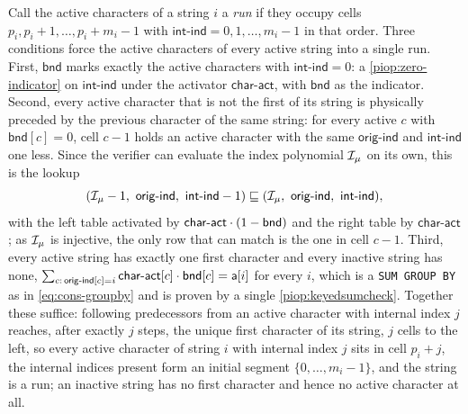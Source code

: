  Call the active characters of a string $i$ a \emph{run} if they occupy cells $p_i, p_i+1, \dots, p_i+m_i-1$ with $\mathsf{int\text{-}ind} = 0, 1, \dots, m_i-1$ in that order. Three conditions force the active characters of every active string into a single run. First, $\mathsf{bnd}$ marks exactly the active characters with $\mathsf{int\text{-}ind} = 0$: a \cref{piop:zero-indicator} on $\mathsf{int\text{-}ind}$ under the activator $\mathsf{char\text{-}act}$, with $\mathsf{bnd}$ as the indicator. Second, every active character that is not the first of its string is physically preceded by the previous character of the same string: for every active $c$ with $\mathsf{bnd}[c] = 0$, cell $c-1$ holds an active character with the same $\mathsf{orig\text{-}ind}$ and $\mathsf{int\text{-}ind}$ one less. Since the verifier can evaluate the index polynomial $\mathcal{I}_\mu$ on its own, this is the lookup
\begin{equation}
  \label{eq:layout-lkup}
  (\idx_\mu - 1,\ \mathsf{orig\text{-}ind},\ \mathsf{int\text{-}ind} - 1) \lookup (\idx_\mu,\ \mathsf{orig\text{-}ind},\ \mathsf{int\text{-}ind}),
\end{equation}
with the left table activated by $\mathsf{char\text{-}act}\cdot(1-\mathsf{bnd})$ and the right table by $\mathsf{char\text{-}act}$; as $\mathcal{I}_\mu$ is injective, the only row that can match is the one in cell $c-1$. Third, every active string has exactly one first character and every inactive string has none, $\sum_{c:\,\mathsf{orig\text{-}ind}[c] = i} \mathsf{char\text{-}act}[c]\cdot\mathsf{bnd}[c] = \mathsf{a}[i]$ for every $i$, which is a \texttt{SUM GROUP BY} as in \cref{eq:cons-groupby} and is proven by a single \cref{piop:keyedsumcheck}. Together these suffice: following predecessors from an active character with internal index $j$ reaches, after exactly $j$ steps, the unique first character of its string, $j$ cells to the left, so every active character of string $i$ with internal index $j$ sits in cell $p_i + j$, the internal indices present form an initial segment $\{0, \dots, m_i-1\}$, and the string is a run; an inactive string has no first character and hence no active character at all.
